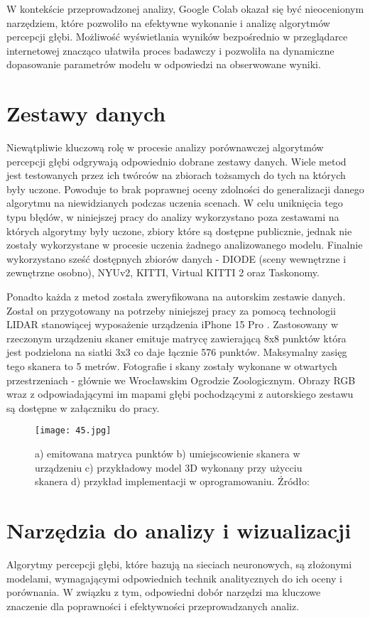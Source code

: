 W kontekście przeprowadzonej analizy, Google Colab okazał się być nieocenionym narzędziem, które pozwoliło na efektywne wykonanie i analizę algorytmów percepcji głębi. Możliwość wyświetlania wyników bezpośrednio w przeglądarce internetowej znacząco ułatwiła proces badawczy i pozwoliła na dynamiczne dopasowanie parametrów modelu w odpowiedzi na obserwowane wyniki.

\section{Zestawy danych}
Niewątpliwie kluczową rolę w procesie analizy porównawczej algorytmów percepcji głębi odgrywają odpowiednio dobrane zestawy danych. Wiele metod jest testowanych przez ich twórców na zbiorach tożsamych do tych na których były uczone. Powoduje to brak poprawnej oceny zdolności do generalizacji danego algorytmu na niewidzianych podczas uczenia scenach. W celu uniknięcia tego typu błędów, w niniejszej pracy do analizy wykorzystano poza zestawami na których algorytmy były uczone, zbiory które są dostępne publicznie, jednak nie zostały wykorzystane w procesie uczenia żadnego analizowanego modelu. Finalnie wykorzystano sześć dostępnych zbiorów danych - DIODE (sceny wewnętrzne i zewnętrzne osobno), NYUv2, KITTI, Virtual KITTI 2 oraz Taskonomy.

Ponadto każda z metod została zweryfikowana na autorskim zestawie danych. Został on przygotowany na potrzeby niniejszej pracy za pomocą technologii LIDAR stanowiącej wyposażenie urządzenia iPhone 15 Pro \cite{chase2022apple}. Zastosowany w rzeczonym urządzeniu skaner emituje matrycę zawierającą 8x8 punktów która jest podzielona na siatki 3x3 co daje łącznie 576 punktów. Maksymalny zasięg tego skanera to 5 metrów. Fotografie i skany zostały wykonane w otwartych przestrzeniach - głównie we Wrocławskim Ogrodzie Zoologicznym. Obrazy RGB wraz z odpowiadającymi im mapami głębi pochodzącymi z autorskiego zestawu są dostępne w załączniku do pracy.
\begin{figure}[H]
    \centering
    \texttt{[image: 45.jpg]}
    \caption{a) emitowana matryca punktów b) umiejscowienie skanera w urządzeniu c) przykładowy model 3D wykonany przy użycciu skanera d) przykład implementacji w oprogramowaniu. Źródło: \cite{luetzenburg2021evaluation}}
    \label{fig:iphone-lidar}
\end{figure}

\section{Narzędzia do analizy i wizualizacji}
Algorytmy percepcji głębi, które bazują na sieciach neuronowych, są złożonymi modelami, wymagającymi odpowiednich technik analitycznych do ich oceny i porównania. W związku z tym, odpowiedni dobór narzędzi ma kluczowe znaczenie dla poprawności i efektywności przeprowadzanych analiz.

